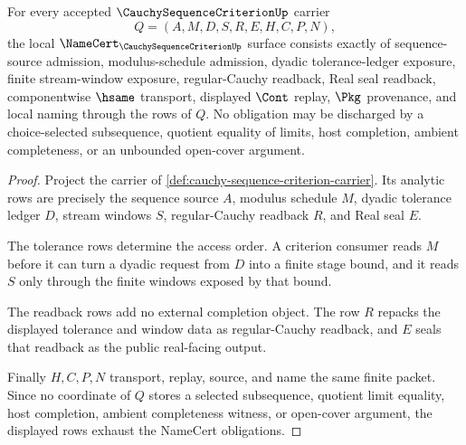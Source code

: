 \begin{theorem}
\label{thm:cauchy-sequence-criterion-namecert-obligations}
For every accepted $\CauchySequenceCriterionUp$ carrier
$$
Q=(A,M,D,S,R,E,H,C,P,N),
$$
the local $\NameCert_{\CauchySequenceCriterionUp}$ surface consists exactly of sequence-source admission, modulus-schedule admission, dyadic tolerance-ledger exposure, finite stream-window exposure, regular-Cauchy readback, Real seal readback, componentwise $\hsame$ transport, displayed $\Cont$ replay, $\Pkg$ provenance, and local naming through the rows of $Q$. No obligation may be discharged by a choice-selected subsequence, quotient equality of limits, host completion, ambient completeness, or an unbounded open-cover argument.
\end{theorem}
\begin{proof}
Project the carrier of \autoref{def:cauchy-sequence-criterion-carrier}. Its analytic rows are precisely the sequence source $A$, modulus schedule $M$, dyadic tolerance ledger $D$, stream windows $S$, regular-Cauchy readback $R$, and Real seal $E$.

The tolerance rows determine the access order. A criterion consumer reads $M$ before it can turn a dyadic request from $D$ into a finite stage bound, and it reads $S$ only through the finite windows exposed by that bound.

The readback rows add no external completion object. The row $R$ repacks the displayed tolerance and window data as regular-Cauchy readback, and $E$ seals that readback as the public real-facing output.

Finally $H,C,P,N$ transport, replay, source, and name the same finite packet. Since no coordinate of $Q$ stores a selected subsequence, quotient limit equality, host completion, ambient completeness witness, or open-cover argument, the displayed rows exhaust the NameCert obligations.
\end{proof}

